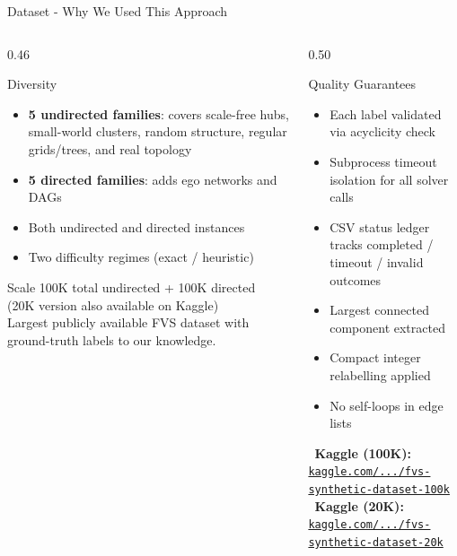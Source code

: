 \documentclass[aspectratio=169]{beamer}
\renewcommand{\footnotesize}{\tiny}
\begin{document}
\begin{frame}{Dataset - Why We Used This Approach}
	\tiny
	\begin{columns}[T]
		\begin{column}{0.46\textwidth}
			\begin{block}{Diversity}
				\begin{itemize}\setlength\itemsep{2pt}
					\item \textbf{5 undirected families}: covers scale-free hubs,
					      small-world clusters, random structure,
					      regular grids/trees, and real topology
					\item \textbf{5 directed families}: adds ego networks and DAGs
					\item Both undirected and directed instances
					\item Two difficulty regimes (exact / heuristic)
				\end{itemize}
			\end{block}
			\vspace{4pt}
			\begin{block}{Scale}
				100K total undirected + 100K directed\\
				{\footnotesize (20K version also available on Kaggle)}\\[4pt]
				Largest publicly available FVS dataset
				with ground-truth labels to our knowledge.
			\end{block}
		\end{column}
		\begin{column}{0.50\textwidth}
			\begin{block}{Quality Guarantees}
				\begin{itemize}\setlength\itemsep{2pt}
					\item Each label validated via acyclicity check
					\item Subprocess timeout isolation for all solver calls
					\item CSV status ledger tracks
					      completed / timeout / invalid outcomes
					\item Largest connected component extracted
					\item Compact integer relabelling applied
					\item No self-loops in edge lists
				\end{itemize}
			\end{block}
			\vspace{4pt}
			\begin{tcolorbox}[greenbox,fontupper=\footnotesize]
				\faDatabase~\textbf{Kaggle (100K):}\\
				\href{https://www.kaggle.com/datasets/tawkirazizrahman/fvs-synthetic-dataset-100k}{%
					\texttt{kaggle.com/.../fvs-synthetic-dataset-100k}}\\[4pt]
				\faDatabase~\textbf{Kaggle (20K):}\\
				\href{https://www.kaggle.com/datasets/tawkirazizrahman/fvs-synthetic-dataset-20k}{%
					\texttt{kaggle.com/.../fvs-synthetic-dataset-20k}}
			\end{tcolorbox}
		\end{column}
	\end{columns}
\end{frame}
\end{document}
